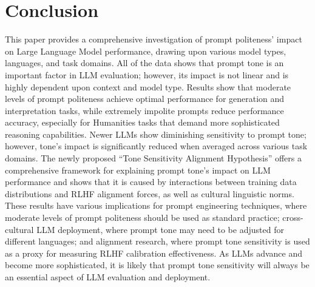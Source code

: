 \documentclass[conference]{IEEEtran}
\begin{document}
\section{Conclusion}

This paper provides a comprehensive investigation of prompt politeness' impact on Large Language Model performance, drawing upon various model types, languages, and task domains. All of the data shows that prompt tone is an important factor in LLM evaluation; however, its impact is not linear and is highly dependent upon context and model type. Results show that moderate levels of prompt politeness achieve optimal performance for generation and interpretation tasks, while extremely impolite prompts reduce performance accuracy, especially for Humanities tasks that demand more sophisticated reasoning capabilities. Newer LLMs show diminishing sensitivity to prompt tone; however, tone's impact is significantly reduced when averaged across various task domains. The newly proposed ``Tone Sensitivity Alignment Hypothesis'' offers a comprehensive framework for explaining prompt tone's impact on LLM performance and shows that it is caused by interactions between training data distributions and RLHF alignment forces, as well as cultural linguistic norms. These results have various implications for prompt engineering techniques, where moderate levels of prompt politeness should be used as standard practice; cross-cultural LLM deployment, where prompt tone may need to be adjusted for different languages; and alignment research, where prompt tone sensitivity is used as a proxy for measuring RLHF calibration effectiveness. As LLMs advance and become more sophisticated, it is likely that prompt tone sensitivity will always be an essential aspect of LLM evaluation and deployment.
\end{document}
